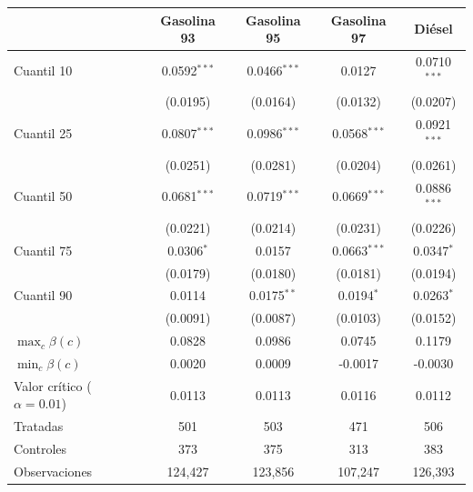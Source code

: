 \begin{tabular}{lcccc}
\toprule
 & Gasolina 93 & Gasolina 95 & Gasolina 97 & Diésel \\
\midrule
Cuantil 10 & 0.0592$^{***}$ & 0.0466$^{***}$ & 0.0127 & 0.0710$^{***}$ \\
 & (0.0195) & (0.0164) & (0.0132) & (0.0207) \\
Cuantil 25 & 0.0807$^{***}$ & 0.0986$^{***}$ & 0.0568$^{***}$ & 0.0921$^{***}$ \\
 & (0.0251) & (0.0281) & (0.0204) & (0.0261) \\
Cuantil 50 & 0.0681$^{***}$ & 0.0719$^{***}$ & 0.0669$^{***}$ & 0.0886$^{***}$ \\
 & (0.0221) & (0.0214) & (0.0231) & (0.0226) \\
Cuantil 75 & 0.0306$^{*}$ & 0.0157 & 0.0663$^{***}$ & 0.0347$^{*}$ \\
 & (0.0179) & (0.0180) & (0.0181) & (0.0194) \\
Cuantil 90 & 0.0114 & 0.0175$^{**}$ & 0.0194$^{*}$ & 0.0263$^{*}$ \\
 & (0.0091) & (0.0087) & (0.0103) & (0.0152) \\
\midrule
$\max_c \beta(c)$ & 0.0828 & 0.0986 & 0.0745 & 0.1179 \\
$\min_c \beta(c)$ & 0.0020 & 0.0009 & -0.0017 & -0.0030 \\
Valor crítico ($\alpha = 0.01$) & 0.0113 & 0.0113 & 0.0116 & 0.0112 \\
\midrule
Tratadas & 501 & 503 & 471 & 506 \\
Controles & 373 & 375 & 313 & 383 \\
Observaciones & 124,427 & 123,856 & 107,247 & 126,393 \\
\bottomrule
\end{tabular}
